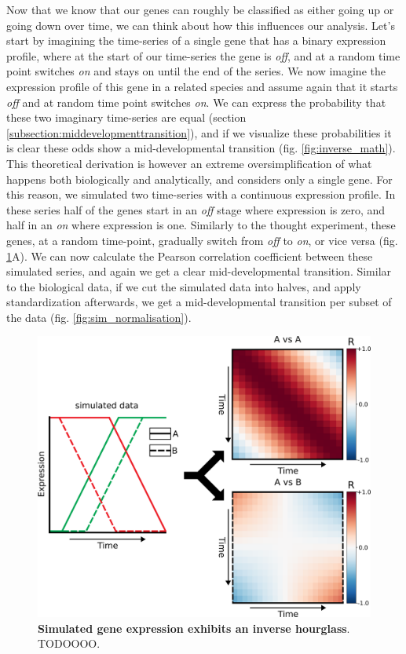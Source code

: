 Now that we know that our genes can roughly be classified as either going up or going down over time, we can think about how this influences our analysis. Let's start by imagining the time-series of a single gene that has a binary expression profile, where at the start of our time-series the gene is \textit{off}, and at a random time point switches \textit{on} and stays on until the end of the series. We now imagine the expression profile of this gene in a related species and assume again that it starts \textit{off} and at random time point switches \textit{on}. We can express the probability that these two imaginary time-series are equal (section \ref{subsection:middevelopmenttransition}), and if we visualize these probabilities it is clear these odds show a mid-developmental transition (fig. \ref{fig:inverse_math}). This theoretical derivation is however an extreme oversimplification of what happens both biologically and analytically, and considers only a single gene. For this reason, we simulated two time-series with a continuous expression profile. In these series half of the genes start in an \textit{off} stage where expression is zero, and half in an \textit{on} where expression is one. Similarly to the thought experiment, these genes, at a random time-point, gradually switch from \textit{off} to \textit{on}, or vice versa (fig. \ref{fig:sim_explanation}A). We can now calculate the Pearson correlation coefficient between these simulated series, and again we get a clear mid-developmental transition. Similar to the biological data, if we cut the simulated data into halves, and apply standardization afterwards, we get a mid-developmental transition per subset of the data (fig. \ref{fig:sim_normalisation}). 

\begin{figure}[H]
    \includegraphics[width=\linewidth]{ch.hourglass/images/sim_explanation.png}
    \caption{\textbf{Simulated gene expression exhibits an inverse hourglass}. TODOOOO.}
    \label{fig:sim_explanation}
\end{figure}

